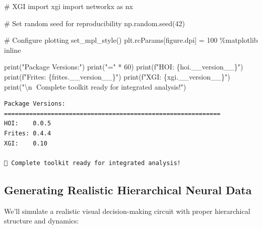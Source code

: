 \documentclass[
  11pt,
  letterpaper,
  oneside,
  openany]{book}
\newenvironment{Shaded}{\begin{snugshade}}{\end{snugshade}}
\newcommand{\BuiltInTok}[1]{\textcolor[rgb]{0.00,0.23,0.31}{#1}}
\newcommand{\CharTok}[1]{\textcolor[rgb]{0.13,0.47,0.30}{#1}}
\newcommand{\CommentTok}[1]{\textcolor[rgb]{0.37,0.37,0.37}{#1}}
\newcommand{\DecValTok}[1]{\textcolor[rgb]{0.68,0.00,0.00}{#1}}
\newcommand{\ImportTok}[1]{\textcolor[rgb]{0.00,0.46,0.62}{#1}}
\newcommand{\NormalTok}[1]{\textcolor[rgb]{0.00,0.23,0.31}{#1}}
\newcommand{\OperatorTok}[1]{\textcolor[rgb]{0.37,0.37,0.37}{#1}}
\newcommand{\SpecialCharTok}[1]{\textcolor[rgb]{0.37,0.37,0.37}{#1}}
\newcommand{\SpecialStringTok}[1]{\textcolor[rgb]{0.13,0.47,0.30}{#1}}
\newcommand{\StringTok}[1]{\textcolor[rgb]{0.13,0.47,0.30}{#1}}
\begin{document}
\begin{Shaded}
\begin{Highlighting}[]
\CommentTok{\# XGI}
\ImportTok{import}\NormalTok{ xgi}
\ImportTok{import}\NormalTok{ networkx }\ImportTok{as}\NormalTok{ nx}

\CommentTok{\# Set random seed for reproducibility}
\NormalTok{np.random.seed(}\DecValTok{42}\NormalTok{)}

\CommentTok{\# Configure plotting}
\NormalTok{set\_mpl\_style()}
\NormalTok{plt.rcParams[}\StringTok{\textquotesingle{}figure.dpi\textquotesingle{}}\NormalTok{] }\OperatorTok{=} \DecValTok{100}
\OperatorTok{\%}\NormalTok{matplotlib inline}

\BuiltInTok{print}\NormalTok{(}\StringTok{"Package Versions:"}\NormalTok{)}
\BuiltInTok{print}\NormalTok{(}\StringTok{"="} \OperatorTok{*} \DecValTok{60}\NormalTok{)}
\BuiltInTok{print}\NormalTok{(}\SpecialStringTok{f"HOI:    }\SpecialCharTok{\{}\NormalTok{hoi}\SpecialCharTok{.}\NormalTok{\_\_version\_\_}\SpecialCharTok{\}}\SpecialStringTok{"}\NormalTok{)}
\BuiltInTok{print}\NormalTok{(}\SpecialStringTok{f"Frites: }\SpecialCharTok{\{}\NormalTok{frites}\SpecialCharTok{.}\NormalTok{\_\_version\_\_}\SpecialCharTok{\}}\SpecialStringTok{"}\NormalTok{)}
\BuiltInTok{print}\NormalTok{(}\SpecialStringTok{f"XGI:    }\SpecialCharTok{\{}\NormalTok{xgi}\SpecialCharTok{.}\NormalTok{\_\_version\_\_}\SpecialCharTok{\}}\SpecialStringTok{"}\NormalTok{)}
\BuiltInTok{print}\NormalTok{(}\StringTok{"}\CharTok{\textbackslash{}n}\StringTok{🎉 Complete toolkit ready for integrated analysis!"}\NormalTok{)}
\end{Highlighting}
\end{Shaded}

\begin{verbatim}
Package Versions:
============================================================
HOI:    0.0.5
Frites: 0.4.4
XGI:    0.10

🎉 Complete toolkit ready for integrated analysis!
\end{verbatim}

\subsection{Generating Realistic Hierarchical Neural
Data}\label{generating-realistic-hierarchical-neural-data}

We'll simulate a realistic visual decision-making circuit with proper
hierarchical structure and dynamics:
\end{document}
